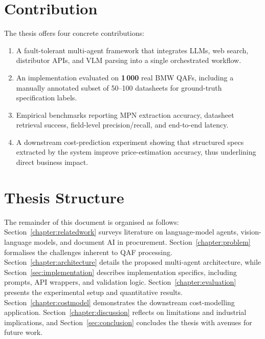 \section{Contribution}
The thesis offers four concrete contributions:
\begin{enumerate}
  \item A fault-tolerant multi-agent framework that integrates LLMs, web search, distributor APIs, and VLM parsing into a single orchestrated workflow.  
  \item An implementation evaluated on \textbf{1\,000} real BMW QAFs, including a manually annotated subset of 50–100 datasheets for ground-truth specification labels.  
  \item Empirical benchmarks reporting MPN extraction accuracy, datasheet retrieval success, field-level precision/recall, and end-to-end latency.  
  \item A downstream cost-prediction experiment showing that structured specs extracted by the system improve price-estimation accuracy, thus underlining direct business impact.
\end{enumerate}

\section{Thesis Structure}
The remainder of this document is organised as follows:  
Section~\ref{chapter:relatedwork} surveys literature on language-model agents, vision-language models, and document AI in procurement.  
Section~\ref{chapter:problem} formalises the challenges inherent to QAF processing.  
Section~\ref{chapter:architecture} details the proposed multi-agent architecture, while Section~\ref{sec:implementation} describes implementation specifics, including prompts, API wrappers, and validation logic.  
Section~\ref{chapter:evaluation} presents the experimental setup and quantitative results.  
Section~\ref{chapter:costmodel} demonstrates the downstream cost-modelling application.  
Section~\ref{chapter:discussion} reflects on limitations and industrial implications, and Section~\ref{sec:conclusion} concludes the thesis with avenues for future work.
